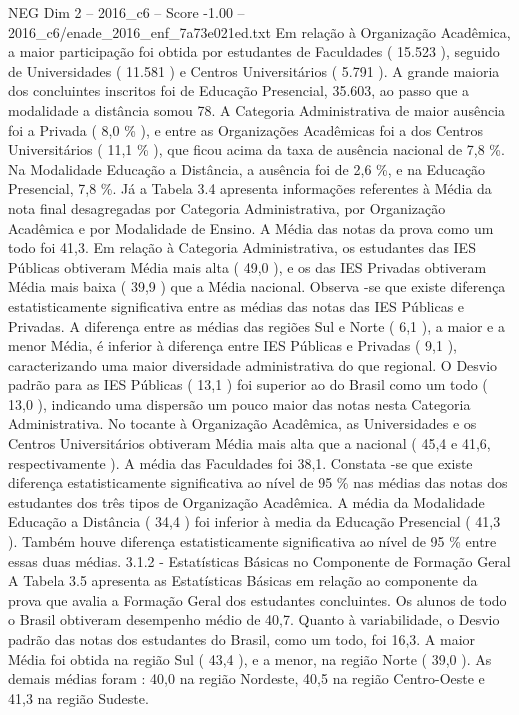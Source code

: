\begin{textsample}{NEG Dim 2 – 2016\_c6 – Score -1.00 – 2016\_c6/enade\_2016\_enf\_7a73e021ed.txt}
Em relação à Organização Acadêmica, a maior participação foi obtida por estudantes de Faculdades ( 15.523 ), seguido de Universidades ( 11.581 ) e Centros Universitários ( 5.791 ).
A grande maioria dos concluintes inscritos foi de Educação Presencial, 35.603, ao passo que a modalidade a distância somou 78.
A Categoria Administrativa de maior ausência foi a Privada ( 8,0 \% ), e entre as Organizações Acadêmicas foi a dos Centros Universitários ( 11,1 \% ), que ficou acima da taxa de ausência nacional de 7,8 \%.
Na Modalidade Educação a Distância, a ausência foi de 2,6 \%, e na Educação Presencial, 7,8 \%.
Já a Tabela 3.4 apresenta informações referentes à Média da nota final desagregadas por Categoria Administrativa, por Organização Acadêmica e por Modalidade de Ensino.
A Média das notas da prova como um todo foi 41,3.
Em relação à Categoria Administrativa, os estudantes das IES Públicas obtiveram Média mais alta ( 49,0 ), e os das IES Privadas obtiveram Média mais baixa ( 39,9 ) que a Média nacional.
Observa -se que existe diferença estatisticamente significativa entre as médias das notas das IES Públicas e Privadas.
A diferença entre as médias das regiões Sul e Norte ( 6,1 ), a maior e a menor Média, é inferior à diferença entre IES Públicas e Privadas ( 9,1 ), caracterizando uma maior diversidade administrativa do que regional.
O Desvio padrão para as IES Públicas ( 13,1 ) foi superior ao do Brasil como um todo ( 13,0 ), indicando uma dispersão um pouco maior das notas nesta Categoria Administrativa.
No tocante à Organização Acadêmica, as Universidades e os Centros Universitários obtiveram Média mais alta que a nacional ( 45,4 e 41,6, respectivamente ).
A média das Faculdades foi 38,1.
Constata -se que existe diferença estatisticamente significativa ao nível de 95 \% nas médias das notas dos estudantes dos três tipos de Organização Acadêmica.
A média da Modalidade Educação a Distância ( 34,4 ) foi inferior à media da Educação Presencial ( 41,3 ).
Também houve diferença estatisticamente significativa ao nível de 95 \% entre essas duas médias. 3.1.2 - Estatísticas Básicas no Componente de Formação Geral A Tabela 3.5 apresenta as Estatísticas Básicas em relação ao componente da prova que avalia a Formação Geral dos estudantes concluintes.
Os alunos de todo o Brasil obtiveram desempenho médio de 40,7.
Quanto à variabilidade, o Desvio padrão das notas dos estudantes do Brasil, como um todo, foi 16,3.
A maior Média foi obtida na região Sul ( 43,4 ), e a menor, na região Norte ( 39,0 ).
As demais médias foram : 40,0 na região Nordeste, 40,5 na região Centro-Oeste e 41,3 na região Sudeste.

\end{textsample}
